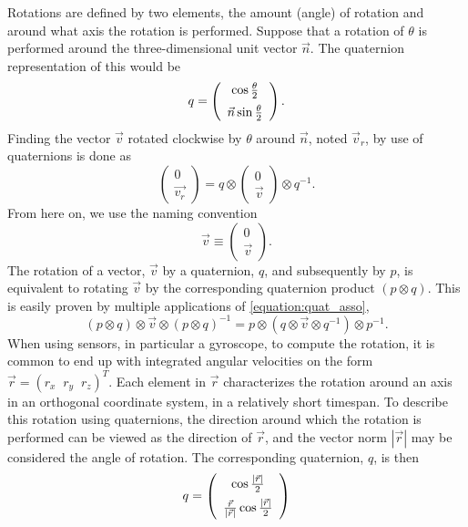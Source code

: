 \documentclass{LTHthesis}
\begin{document}
Rotations are defined by two elements, the amount (angle) of rotation and around what axis the rotation is performed. Suppose that a rotation of $\theta$ is performed around the three-dimensional unit vector $\vec n$. The quaternion representation of this would be
\begin{equation}
q = \left(\begin{array}{c}\cos{\frac{\theta}{2}}\vspace{5pt}\\ \vec{n}\sin{\frac{\theta}{2}}\end{array}\right).
\end{equation}  
%
Finding the vector $\vec v$ rotated clockwise by $\theta$ around $\vec n$, noted $\vec v_r$, by use of quaternions is done as
%
\begin{equation}
\left(\begin{array}{c}0\\ \vec{v_r}\end{array}\right) = q\otimes \left(\begin{array}{c}0\\ \vec{v}\end{array}\right) \otimes q^{-1}.
\end{equation}
%
From here on, we use the naming convention
%
\begin{equation}
\vec v\equiv \left(\begin{array}{c}0\\ \vec{v}\end{array}\right).
\end{equation}
%
The rotation of a vector, $\vec v$ by a quaternion, $q$, and subsequently by $p$, is equivalent to rotating $\vec v$ by the corresponding quaternion product $(p\otimes q)$. This is easily proven by multiple applications of \ref{equation:quat_asso},
%
\begin{equation}
(p\otimes q)\otimes \vec v \otimes (p\otimes q)^{-1}=p\otimes(q\otimes\vec v\otimes q^{-1})\otimes p^{-1}. 
\end{equation}
%
When using sensors, in particular a gyroscope, to compute the rotation, it is common to end up with integrated angular velocities on the form $\vec{r} = (r_x \; \; r_y \; \; r_z)^T$. Each element in $\vec r$ characterizes the rotation around an axis in an orthogonal coordinate system, in a relatively short timespan. To describe this rotation using quaternions, the direction around which the rotation is performed can be viewed as the direction of $\vec r$, and the vector norm $|\vec r|$ may be considered the angle of rotation. The corresponding quaternion, $q$, is then
%
\begin{equation}
q = \left(\begin{array}{c}\cos{\frac{|\vec r|}{2}}\vspace{5pt} \\ \frac{\vec{r}}{|\vec r|}\cos{\frac{|\vec r|}{2}}\end{array}\right)
\end{equation}
%
\end{document}
